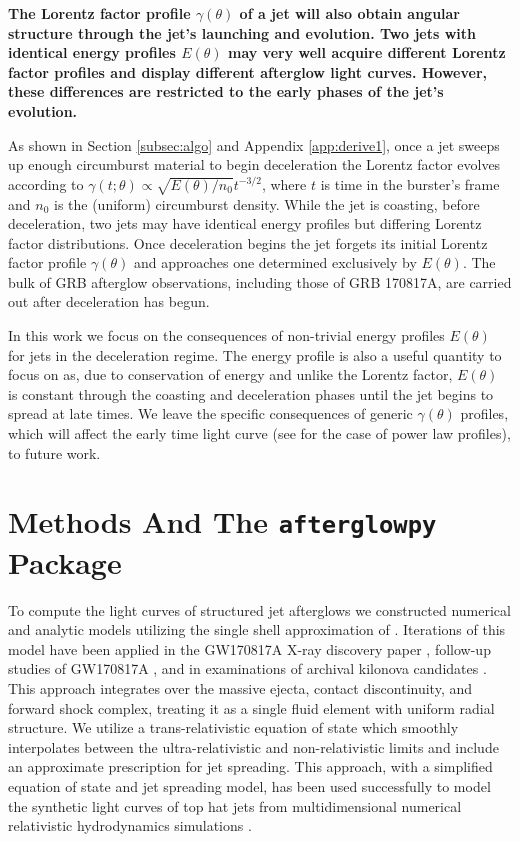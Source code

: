 \documentclass[twocolumn]{aastex62}
\newcommand{\gwbns}{GW170817A}
\newcommand{\grbbns}{GRB 170817A}
\newcommand{\afterglowpy}{{\tt afterglowpy}}
\begin{document}
{\bf 
The Lorentz factor profile $\gamma(\theta)$ of a jet will also obtain angular structure through the jet's launching and evolution.  Two jets with identical energy profiles $E(\theta)$ may very well acquire different Lorentz factor profiles and display different afterglow light curves.  However, these differences are restricted to the early phases of the jet's evolution.

As shown in Section \ref{subsec:algo} and Appendix \ref{app:derive1}, once a jet sweeps up enough circumburst material to begin deceleration the Lorentz factor evolves according to $\gamma(t; \theta) \propto \sqrt{E(\theta) / n_0} t^{-3/2}$, where $t$ is time in the burster's frame and $n_0$ is the (uniform) circumburst density.   While the jet is coasting, before deceleration, two jets may have identical energy profiles but differing Lorentz factor distributions.  Once deceleration begins the jet forgets its initial Lorentz factor profile $\gamma(\theta)$ and approaches one determined exclusively by $E(\theta)$.  The bulk of GRB afterglow observations, including those of \grbbns{}, are carried out after deceleration has begun.

 In this work we focus on the consequences of non-trivial energy profiles $E(\theta)$ for jets in the deceleration regime.  The energy profile is also a useful quantity to focus on as, due to conservation of energy and unlike the Lorentz factor, $E(\theta)$ is constant through the coasting and deceleration phases until the jet begins to spread at late times.  We leave the specific consequences of generic $\gamma(\theta)$ profiles, which will affect the early time light curve (see \cite{Beniamini:2020ab} for the case of power law profiles), to future work. 
}

%
%


\section{Methods And The \afterglowpy{} Package}\label{sec:numerical}

To compute the light curves of structured jet afterglows we constructed numerical and analytic models utilizing the single shell approximation of \cite{van-Eerten:2010aa, van-Eerten:2018ab}.  Iterations of this model have been applied in the \gwbns{} X-ray discovery paper \citep{Troja:2017aa}, follow-up studies of \gwbns{} \citep{Troja:2018aa, Piro:2019aa, Troja:2019ab}, and in examinations of archival kilonova candidates \citep{Troja:2018ab, Troja:2019aa}. This approach integrates over the massive ejecta, contact discontinuity, and forward shock complex, treating it as a single fluid element with uniform radial structure. We utilize a trans-relativistic equation of state which smoothly interpolates between the ultra-relativistic and non-relativistic limits \citep{van-Eerten:2013ab, Nava:2013aa} and include an approximate prescription for jet spreading.  This approach, with a simplified equation of state and jet spreading model, has been used successfully to model the synthetic light curves of top hat jets from multidimensional numerical relativistic hydrodynamics simulations \citep{van-Eerten:2010aa}.
\end{document}
